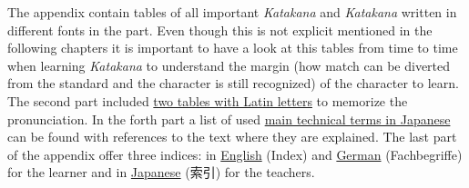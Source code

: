 The appendix contain tables of all important \textit{Katakana} and
\textit{Katakana} written in different fonts in the
 part. Even though this is not explicit mentioned
in the following chapters it is important to have a look at this tables from
time to time when learning \textit{Katakana} to understand the margin (how
match can be diverted from the standard and the character is still recognized)
of the character to learn. The second part included
\hyperref[chap:RomajiTables]{two tables with Latin letters} to memorize the
pronunciation. In the forth part a list of used
\hyperref[chap:JapaneseTechnicalTerms]{main technical terms in Japanese} can be
found with references to the text where they are explained.  The last part of
the appendix offer three indices: in \hyperref[chap:EnglishIndex]{English}
(Index) and \hyperref[chap:GermanIndex]{German} (Fachbegriffe) for the learner
and in \hyperref[chap:JapaneseIndex]{Japanese} (索引) for the teachers. 




